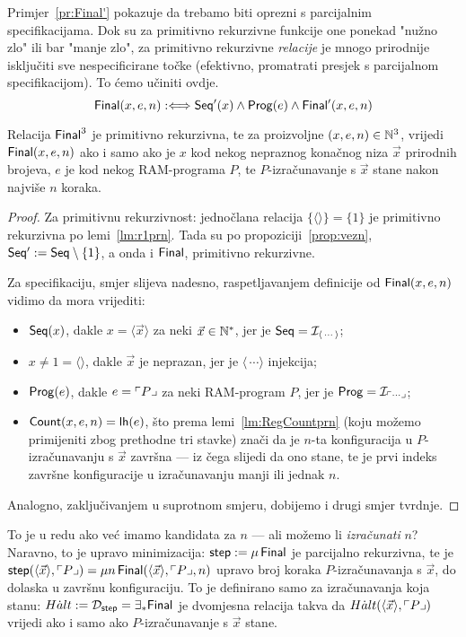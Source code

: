 Primjer~\ref{pr:Final'} pokazuje da trebamo biti oprezni s parcijalnim specifikacijama. Dok su za primitivno rekurzivne funkcije one ponekad "nužno zlo" ili bar "manje zlo", za primitivno rekurzivne \emph{relacije} je mnogo prirodnije isključiti sve nespecificirane točke (efektivno, promatrati presjek s parcijalnom specifikacijom). To ćemo učiniti ovdje.
\begin{equation}
\mathsf{Final}(x,e,n):\Longleftrightarrow\mathsf{Seq'}(x)\land\mathsf{Prog}(e)\land\mathsf{Final'}(x,e,n)
\end{equation}

\begin{lema}\label{lm:Finalspec}
Relacija $\mathsf{Final}^3$ je primitivno rekurzivna, te
za proizvoljne $(x,e,n)\in{\mathbb N}^3$, vrijedi $\mathsf{Final}(x,e,n)$ ako i samo ako je $x$ kod nekog nepraznog konačnog niza $\vec x$ prirodnih brojeva, $e$ je kod nekog RAM-programa $P$, te $P$-izračunavanje s $\vec x$ stane nakon najviše $n$ koraka.
\end{lema}
\begin{proof}
Za primitivnu rekurzivnost: jednočlana relacija $\{\langle\rangle\}=\{1\}$ je primitivno rekurzivna po lemi~\ref{lm:r1prn}. Tada su po propoziciji~\ref{prop:vezn}, $\mathsf{Seq'}:=\mathsf{Seq}\setminus\{1\}$, a onda i $\mathsf{Final}$, primitivno rekurzivne.

Za specifikaciju, smjer slijeva nadesno, raspetljavanjem definicije od $\mathsf{Final}(x,e,n)$ vidimo da mora vrijediti:
\begin{itemize}
    \item $\mathsf{Seq}(x)$, dakle $x=\langle\vec x\rangle$ za neki $\vec x\in{\mathbb N}^*$, jer je $\mathsf{Seq}=\mathcal I_{\langle\,\cdots\rangle}$;
    \item $x\not=1=\langle\rangle$, dakle $\vec x$ je neprazan, jer je $\langle\,\cdots\rangle$ injekcija;
    \item $\mathsf{Prog}(e)$, dakle $e=\ulcorner P\lrcorner$ za neki RAM-program $P$, jer je $\mathsf{Prog}=\mathcal I_{\ulcorner\cdots\lrcorner}$;
    \item $\mathsf{Count}(x,e,n)=\mathsf{lh}(e)$, što prema lemi~\ref{lm:RegCountprn} (koju možemo primijeniti zbog prethodne tri stavke) znači da je $n$-ta konfiguracija u $P$-izračunavanju s $\vec x$ završna --- iz čega slijedi da ono stane, te je prvi indeks završne konfiguracije u izračunavanju manji ili jednak $n$.
\end{itemize}
Analogno, zaključivanjem u suprotnom smjeru, dobijemo i drugi smjer tvrdnje.
\end{proof}

To je u redu ako već imamo kandidata za $n$ --- ali možemo li \emph{izračunati} $n$? Naravno, to je upravo minimizacija:  $\mathsf{step}:=\mu\,\mathsf{Final}$ je parcijalno rekurzivna, te je $\mathsf{step}(\langle\vec x\rangle,\ulcorner P\lrcorner)=\mu n\,\mathsf{Final}(\langle\vec x\rangle,\ulcorner P\lrcorner,n)$ upravo broj koraka $P$-izračunavanja s $\vec x$, do dolaska u završnu konfiguraciju. To je definirano samo za izračunavanja koja stanu: $H\dot alt:=\mathcal D_{\mathsf{step}}=\exists_*\mathsf{Final}$ je dvomjesna relacija takva da $H\dot alt(\langle \vec x\rangle,\ulcorner P\lrcorner)$ vrijedi ako i samo ako $P$-izračunavanje s $\vec x$ stane.

